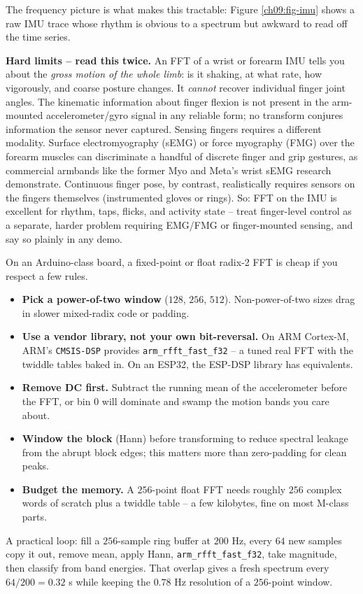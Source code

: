 The frequency picture is what makes this tractable: Figure \ref{ch09:fig-imu} shows a raw
IMU trace whose rhythm is obvious to a spectrum but awkward to read off the time series.

\begin{goalbox}
\textbf{Hard limits -- read this twice.} An FFT of a wrist or forearm IMU tells you
about the \emph{gross motion of the whole limb}: is it shaking, at what rate, how
vigorously, and coarse posture changes. It \emph{cannot} recover individual finger joint
angles. The kinematic information about finger flexion is not present in the
arm-mounted accelerometer/gyro signal in any reliable form; no transform conjures
information the sensor never captured. Sensing fingers requires a different modality.
Surface electromyography (sEMG) or force myography (FMG) over the forearm muscles can
discriminate a handful of discrete finger and grip gestures, as commercial armbands like the
former Myo and Meta's wrist sEMG research demonstrate. Continuous finger pose, by contrast,
realistically requires sensors on the fingers themselves (instrumented gloves or rings). So: FFT on the IMU is excellent for rhythm, taps, flicks,
and activity state -- treat finger-level control as a separate, harder problem requiring
EMG/FMG or finger-mounted sensing, and say so plainly in any demo.
\end{goalbox}

\begin{buildbox}
On an Arduino-class board, a fixed-point or float radix-2 FFT is cheap if you respect a
few rules.
\begin{itemize}
\item \textbf{Pick a power-of-two window} ($128$, $256$, $512$). Non-power-of-two sizes
drag in slower mixed-radix code or padding.
\item \textbf{Use a vendor library, not your own bit-reversal.} On ARM Cortex-M, ARM's
\texttt{CMSIS-DSP} provides \texttt{arm\_rfft\_fast\_f32} -- a tuned real FFT with the
twiddle tables baked in. On an ESP32, the ESP-DSP library has equivalents.
\item \textbf{Remove DC first.} Subtract the running mean of the accelerometer before the
FFT, or bin $0$ will dominate and swamp the motion bands you care about.
\item \textbf{Window the block} (Hann) before transforming to reduce spectral leakage
from the abrupt block edges; this matters more than zero-padding for clean peaks.
\item \textbf{Budget the memory.} A $256$-point float FFT needs roughly $256$ complex
words of scratch plus a twiddle table -- a few kilobytes, fine on most M-class parts.
\end{itemize}
A practical loop: fill a $256$-sample ring buffer at $200$ Hz, every $64$ new samples copy
it out, remove mean, apply Hann, \texttt{arm\_rfft\_fast\_f32}, take magnitude, then
classify from band energies. That overlap gives a fresh spectrum every $64/200 = 0.32$ s
while keeping the $0.78$ Hz resolution of a $256$-point window.
\end{buildbox}

